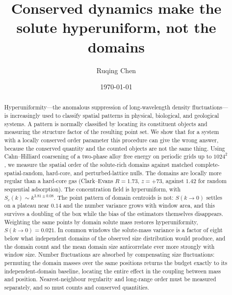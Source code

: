 \documentclass[aps,pre,twocolumn,superscriptaddress,floatfix,longbibliography]{revtex4-2}
\begin{document}
\title{Conserved dynamics make the solute hyperuniform, not the domains}

\author{Ruqing Chen}

\date{\today}

\begin{abstract}
Hyperuniformity---the anomalous suppression of long-wavelength density
fluctuations---is increasingly used to classify spatial patterns in physical,
biological, and geological systems. A pattern is normally classified by
locating its constituent objects and measuring the structure factor of the
resulting point set. We show that for a system with a locally conserved order
parameter this procedure can give the wrong answer, because the conserved
quantity and the counted objects are not the same thing. Using Cahn--Hilliard
coarsening of a two-phase alloy free energy on periodic grids up to
$1024^2$, we measure the spatial order of the solute-rich domains against
matched complete-spatial-random, hard-core, and perturbed-lattice nulls. The
domains are locally more regular than a hard-core gas (Clark--Evans
$R = 1.73$, $z = +73$, against $1.42$ for random sequential adsorption). The
concentration field is hyperuniform, with $S_c(k) \sim k^{3.81 \pm 0.08}$. The
point pattern of domain centroids is not: $S(k \to 0)$ settles on a plateau
near $0.14$ and the number variance grows with window area, and this survives
a doubling of the box while the bias of the estimators themselves disappears.
Weighting the same points by domain solute mass restores hyperuniformity,
$S(k \to 0) = 0.021$. In common windows the solute-mass variance is a factor
of eight below what independent domains of the observed size distribution
would produce, and the domain count and the mean domain size anticorrelate
ever more strongly with window size. Number fluctuations are absorbed by
compensating size fluctuations: permuting the domain masses over the same
positions returns the budget exactly to its independent-domain baseline,
locating the entire effect in the coupling between mass and position. Nearest-neighbour regularity and long-range
order must be measured separately, and so must counts and conserved
quantities.
\end{abstract}

\maketitle
\end{document}
